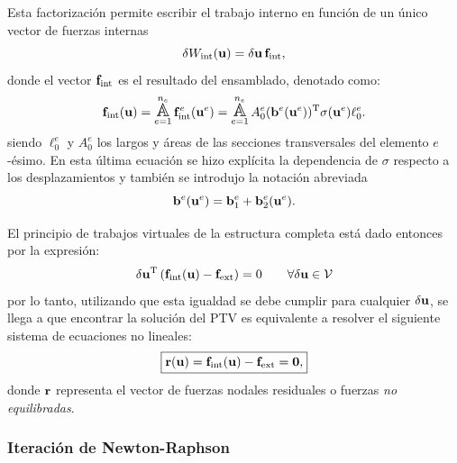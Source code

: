 Esta factorización permite escribir el trabajo interno en función de un único vector de fuerzas internas
%
\begin{equation}
\delta  W_{ \text{int} } (\bfu) %
%
=
\delta\bfu
\,
\bff_{\text{int}},
\end{equation}
%
donde el vector ${\bf f}_{\text{int}}$ es el resultado del ensamblado, denotado como:
%
\begin{equation}
\bff_{\text{int}}(\bfu) = \assem_{e=1}^{n_e} \bff^e_{\text{int}}(\bfu^e) 
=\assem_{e=1}^{n_e} A^e_0   (\bfb^e (\bfu^e) )^{\text{T}} \sigma(\bfu^e) \ell^e_0.
\end{equation}
%
siendo $\ell_0^e$ y $A_0^e$ los largos y áreas de las secciones transversales del elemento $e$-ésimo. %
%
En esta última ecuación se hizo explícita la dependencia de $\sigma$ respecto a los desplazamientos y también se introdujo la notación abreviada
%
\begin{equation}
{\bf b}^e ({\bf u}^e) = {\bf b}_1^e + {\bf b}_2^e ({\bf u}^e).
\end{equation}

El principio de trabajos virtuales de la estructura completa está dado entonces por la expresión:
%
\begin{equation}
\delta {\bf u}^{\text{T}} \left( {\bf f}_{\text{int}}({\bf u}) - {\bf f}_{\text{ext}} \right) = 0 \qquad \forall \delta {\bf u} \in {\mathcal V}
\end{equation}
%
por lo tanto, utilizando que esta igualdad se debe cumplir para cualquier $\delta {\bf u}$, se llega a que encontrar la solución del PTV es equivalente a resolver el siguiente sistema de ecuaciones no lineales:
%
\begin{equation}\label{eqn:residuo}
\boxed{
	{\bf r}({\bf u}) = {\bf f}_{\text{int}}({\bf u}) - {\bf f}_{\text{ext}} = \boldsymbol{0},
}
\end{equation}
%
donde ${\bf r}$ representa el vector de fuerzas nodales residuales o fuerzas \textit{no equilibradas}.




\subsubsection{Iteración de Newton-Raphson} \label{sec:iterNR}

